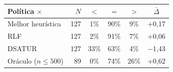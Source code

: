 \begin{tabular}{@{}lrcccc@{}}
\toprule
Política $\times$ & $N$ & $<$ & $=$ & $>$ & $\bar{\Delta}$ \\
\midrule
Melhor heurística & 127 & 1\% & 90\% & 9\% & +0{,}17 \\
RLF & 127 & 2\% & 91\% & 7\% & +0{,}06 \\
DSATUR & 127 & 33\% & 63\% & 4\% & $-$1{,}43 \\
Oráculo ($n \le 500$) & 89 & 0\% & 74\% & 26\% & +0{,}62 \\
\bottomrule
\end{tabular}

